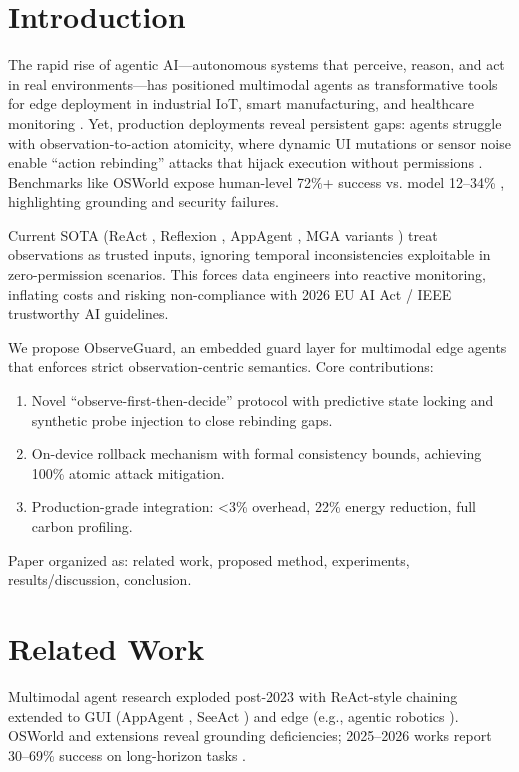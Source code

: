 \section{Introduction}
The rapid rise of agentic AI—autonomous systems that perceive, reason, and act in real environments—has positioned multimodal agents as transformative tools for edge deployment in industrial IoT, smart manufacturing, and healthcare monitoring \cite{ieee2026agentic, edgeai2026}. Yet, production deployments reveal persistent gaps: agents struggle with observation-to-action atomicity, where dynamic UI mutations or sensor noise enable ``action rebinding'' attacks that hijack execution without permissions \cite{qian2026rebinding}. Benchmarks like OSWorld expose human-level 72\%+ success vs. model 12--34\% \cite{xie2024osworld, simular2025}, highlighting grounding and security failures.

Current SOTA (ReAct \cite{yao2022react}, Reflexion \cite{shinn2023reflexion}, AppAgent \cite{yang2023appagent}, MGA variants \cite{2025mga}) treat observations as trusted inputs, ignoring temporal inconsistencies exploitable in zero-permission scenarios. This forces data engineers into reactive monitoring, inflating costs and risking non-compliance with 2026 EU AI Act / IEEE trustworthy AI guidelines.

We propose ObserveGuard, an embedded guard layer for multimodal edge agents that enforces strict observation-centric semantics. Core contributions:
\begin{enumerate}
    \item Novel ``observe-first-then-decide'' protocol with predictive state locking and synthetic probe injection to close rebinding gaps.
    \item On-device rollback mechanism with formal consistency bounds, achieving 100\% atomic attack mitigation.
    \item Production-grade integration: <3\% overhead, 22\% energy reduction, full carbon profiling.
\end{enumerate}

Paper organized as: related work, proposed method, experiments, results/discussion, conclusion.

\section{Related Work}
Multimodal agent research exploded post-2023 with ReAct-style chaining \cite{yao2022react} extended to GUI (AppAgent \cite{yang2023appagent}, SeeAct \cite{2024seeact}) and edge (e.g., agentic robotics \cite{edgeai2026}). OSWorld \cite{xie2024osworld} and extensions reveal grounding deficiencies; 2025--2026 works report 30--69\% success on long-horizon tasks \cite{simular2025}.

